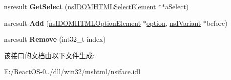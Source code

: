 \begin{DoxyCompactItemize}
\item 
\mbox{\label{interfacens_i_d_o_m_h_t_m_l_options_collection_a88cfec4fa469cae3bf5c36dddfa7ad88}} 
nsresult {\bfseries Get\+Select} (\hyperlink{interfacens_i_d_o_m_h_t_m_l_select_element}{ns\+I\+D\+O\+M\+H\+T\+M\+L\+Select\+Element} $\ast$$\ast$a\+Select)
\item 
\mbox{\label{interfacens_i_d_o_m_h_t_m_l_options_collection_ae6d120ede9e07d3f4097df4f9b47463b}} 
nsresult {\bfseries Add} (\hyperlink{interfacens_i_d_o_m_h_t_m_l_option_element}{ns\+I\+D\+O\+M\+H\+T\+M\+L\+Option\+Element} $\ast$\hyperlink{structoption}{option}, \hyperlink{interfacens_i_variant}{ns\+I\+Variant} $\ast$before)
\item 
\mbox{\label{interfacens_i_d_o_m_h_t_m_l_options_collection_adc0ab00c2e313cc08ebf5139bbbe48c8}} 
nsresult {\bfseries Remove} (int32\+\_\+t index)
\end{DoxyCompactItemize}


该接口的文档由以下文件生成\+:\begin{DoxyCompactItemize}
\item 
E\+:/\+React\+O\+S-\/0../dll/win32/mshtml/nsiface.\+idl\end{DoxyCompactItemize}
